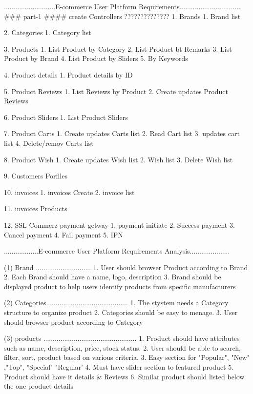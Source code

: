 ...........................E-commerce User Platform Requirements................................
### part-1 #### create Controllers ??????????????
1. Brands
   1. Brand list 

2. Categories
   1. Category list

3. Products
   1. List Product by Category
   2. List Product bt Remarks
   3. List Product by Brand
   4. List Product by Sliders
   5. By Keywords

4. Product details
   1. Product details by ID

5. Product Reviews
   1. List Reviews by Product
   2. Create updates Product Reviews

6. Product Sliders
   1. List Product Sliders

7. Product Carts 
   1. Create updates Carts list
   2. Read Cart list
   3. updates cart list 
   4. Delete/remov Carts list

8. Product Wish
   1. Create updates Wish list
   2. Wish list
   3. Delete Wish list

9. Customers Porfiles

10. invoices
    1. invoices Create
    2. invoice list

11. invoices Products

12. SSL Commerz payment getway 
    1. payment initiate
    2. Success payment 
    3. Cancel payment
    4. Fail payment
    5. IPN

..................E-commerce User Platform Requirements Analysis.....................

    (1) Brand .............................
        1. User should browser Product according to Brand
        2. Each Brand should have a name, logo, description
        3. Brand should be displayed product to help users identify products from specific manufacturers
    
    (2) Categories...........................................
        1. The stystem needs a Category structure to organize product
        2. Categories should be easy to menage.
        3. User should browser product according to Category
    
    (3) products .................................................
        1. Product should have attributes such as name, description, price, stock status.
        2. User should be able to search, filter, sort, product based on various criteria.
        3. Easy section for "Popular", "New" ,"Top", "Special" "Regular'
        4. Must have slider section to featured product 
        5. Product should have it details & Reviews
        6. Similar product should listed below the one product details
    

